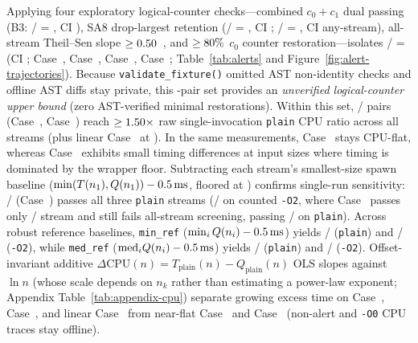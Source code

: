 \documentclass[11pt]{article}
\newcommand{\CaseRef}[1]{Case~#1}
\begin{document}
Applying four exploratory logical-counter checks---combined $c_0+c_1$ dual passing (B3: \BenchBThreeAlertsN{}/\BenchFittedClusters{} = \BenchBThreePct{}, CI \BenchBThreeCI{}), SA8 drop-largest retention (\BenchSAEightAlertsN{}/\BenchSAEightAdmittedN{} = \BenchSAEightPct{}, CI \BenchSAEightCI{}; \BenchSAEightAnyAlertsN{}/\BenchSAEightAdmittedN{} = \BenchSAEightAnyPct{}, CI \BenchSAEightAnyCI{} any-stream), all-stream Theil--Sen slope $\ge 0.50{}$~\cite{theil1950rank,sen1968estimates}, and $\ge 80\%{}$ $c_0$ counter restoration---isolates \BenchCoreFourN{}/\BenchFittedClusters{} = \BenchCoreFourPct{} (CI \BenchCoreFourCI{}; \CaseRef{\BenchPosThirteen{}}, \CaseRef{\BenchPosNineFour{}}, \CaseRef{\BenchPosNineSeven{}}, \CaseRef{\BenchPosOneSevenFive{}}; Table~\ref{tab:alerts} and Figure~\ref{fig:alert-trajectories}).
Because \texttt{validate\_fixture()} omitted AST non-identity checks and offline AST diffs stay private, this \BenchCoreFourN{}-pair set provides an \emph{unverified logical-counter upper bound} (zero AST-verified minimal restorations).
Within this set, \BenchRealizedCpuCoreN{}/\BenchFittedClusters{} pairs (\CaseRef{\BenchPosThirteen{}}, \CaseRef{\BenchPosOneSevenFive{}}) reach $\ge 1.50{}\times$ raw single-invocation \texttt{plain} CPU ratio across all streams (plus linear \CaseRef{\BenchPosOneSixFour{}} at \BenchPosOneSixFourCpuRatio{}). In the same measurements, \CaseRef{\BenchPosNineFour{}} stays CPU-flat, whereas \CaseRef{\BenchPosNineSeven{}} exhibits small timing differences at input sizes where timing is dominated by the \BenchBwrapOverheadMs{} wrapper floor.
Subtracting each stream's smallest-size spawn baseline ($\min(T(n_1), Q(n_1)) - 0.5\,\text{ms}{}$, floored at \BenchSpawnFloorMs{}) confirms single-run sensitivity: \BenchPlainSubCoreN{}/\BenchFittedClusters{} (\CaseRef{\BenchPosOneSevenFive{}}) passes all three \texttt{plain} streams (\BenchOtwoSubCoreN{}/\BenchFittedClusters{} on counted \texttt{-O2}, where \CaseRef{\BenchPosNineSeven{}} passes only \BenchPosNineSevenOtwoStreamsN{}/\BenchNumStreams{} stream and still fails all-stream screening, passing \BenchPosNineSevenPlainStreamsN{}/\BenchNumStreams{} on \texttt{plain}).
Across robust reference baselines, \texttt{min\_ref} ($\min_i Q(n_i) - 0.5\,\text{ms}{}$) yields \BenchMinRefPlainCoreN{}/\BenchFittedClusters{} (\texttt{plain}) and \BenchMinRefOtwoCoreN{}/\BenchFittedClusters{} (\texttt{-O2}), while \texttt{med\_ref} ($\text{med}_i Q(n_i) - 0.5\,\text{ms}{}$) yields \BenchMedRefPlainCoreN{}/\BenchFittedClusters{} (\texttt{plain}) and \BenchMedRefOtwoCoreN{}/\BenchFittedClusters{} (\texttt{-O2}). Offset-invariant additive $\Delta\text{CPU}(n)=T_{\text{plain}}(n)-Q_{\text{plain}}(n)$ OLS slopes against $\ln n$ (whose scale depends on $n_k$ rather than estimating a power-law exponent; Appendix Table~\ref{tab:appendix-cpu}) separate growing excess time on \CaseRef{\BenchPosThirteen{}}, \CaseRef{\BenchPosOneSevenFive{}}, and linear \CaseRef{\BenchPosOneSixFour{}} from near-flat \CaseRef{\BenchPosNineFour{}} and \CaseRef{\BenchPosNineSeven{}} (non-alert and \texttt{-O0} CPU traces stay offline).
\end{document}
